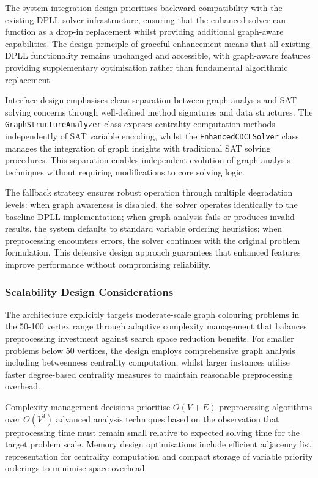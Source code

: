 The system integration design prioritises backward compatibility with the existing DPLL solver infrastructure, ensuring that the enhanced solver can function as a drop-in replacement whilst providing additional graph-aware capabilities. The design principle of graceful enhancement means that all existing DPLL functionality remains unchanged and accessible, with graph-aware features providing supplementary optimisation rather than fundamental algorithmic replacement.

Interface design emphasises clean separation between graph analysis and SAT solving concerns through well-defined method signatures and data structures. The \texttt{Graph\-Structure\-Analyzer} class exposes centrality computation methods independently of SAT variable encoding, whilst the \texttt{Enhanced\-CDCL\-Solver} class manages the integration of graph insights with traditional SAT solving procedures. This separation enables independent evolution of graph analysis techniques without requiring modifications to core solving logic.

The fallback strategy ensures robust operation through multiple degradation levels: when graph awareness is disabled, the solver operates identically to the baseline DPLL implementation; when graph analysis fails or produces invalid results, the system defaults to standard variable ordering heuristics; when preprocessing encounters errors, the solver continues with the original problem formulation. This defensive design approach guarantees that enhanced features improve performance without compromising reliability.

\subsubsection{Scalability Design Considerations}

The architecture explicitly targets moderate-scale graph colouring problems in the 50-100 vertex range through adaptive complexity management that balances preprocessing investment against search space reduction benefits. For smaller problems below 50 vertices, the design employs comprehensive graph analysis including betweenness centrality computation, whilst larger instances utilise faster degree-based centrality measures to maintain reasonable preprocessing overhead.

Complexity management decisions prioritise $O(V+E)$ preprocessing algorithms over $O(V^3)$ advanced analysis techniques based on the observation that preprocessing time must remain small relative to expected solving time for the target problem scale. Memory design optimisations include efficient adjacency list representation for centrality computation and compact storage of variable priority orderings to minimise space overhead.

